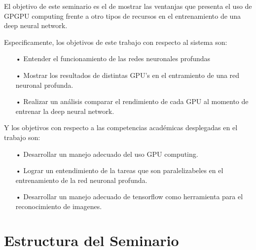 El objetivo de este seminario es el de mostrar las ventanjas que presenta el uso de GPGPU computing frente a otro tipos de recursos en el entrenamiento de una deep neural network.

Especificamente, los objetivos de este trabajo con respecto al sistema son:

\begin{itemize}
\item[•] Entender el funcionamiento de las redes neuronales profundas%
\item[•] Mostrar los resultados de distintas GPU's en el entramiento de una red neuronal profunda.%
\item[•] Realizar un análisis comparar el rendimiento de cada GPU al momento de entrenar la deep neural network.%


\end{itemize}

Y los objetivos con respecto a las competencias académicas desplegadas en el trabajo son:
\begin{itemize}
\item[•] Desarrollar un manejo adecuado del uso GPU computing.%
\item[•] Lograr un entendimiento de la tareas que son paralelizabeles en el entrenamiento de la red neuronal profunda.%
\item[•] Desarrollar un manejo adecuado de tensorflow como herramienta para el reconocimiento de imagenes.%

\end{itemize}

\section{Estructura del Seminario}


